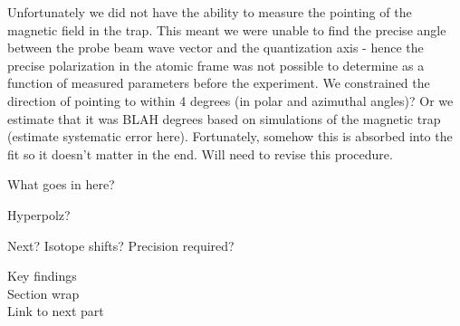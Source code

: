 Unfortunately we did not have the ability to measure the pointing of the magnetic field in the trap. This meant we were unable to find the precise angle between the probe beam wave vector and the quantization axis - hence the precise polarization in the atomic frame was not possible to determine as a function of measured parameters before the experiment. We constrained the direction of pointing to within 4 degrees (in polar and azimuthal angles)? Or we estimate that it was BLAH degrees based on simulations of the magnetic trap (estimate systematic error here). Fortunately, somehow this is absorbed into the fit so it doesn't matter in the end. Will need to revise this procedure.  




What goes in here?




Hyperpolz?


Next? Isotope shifts? Precision required?


Key findings\\
Section wrap\\
Link to next part
